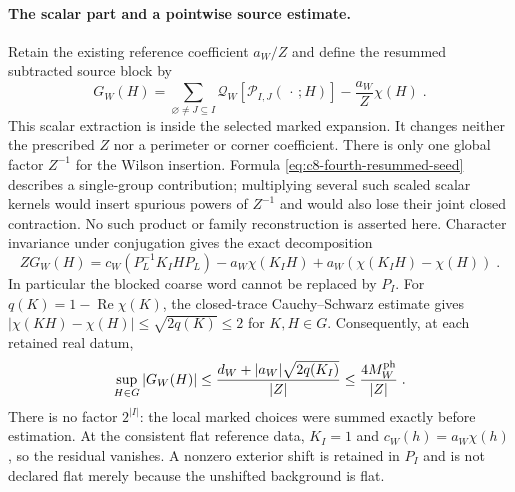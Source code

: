 \documentclass[11pt]{article}
\begin{document}
\paragraph{The scalar part and a pointwise source estimate.}
Retain the existing reference coefficient $a_W/Z$ and define
the resummed subtracted source block by
\begin{equation}\label{eq:c8-fourth-resummed-seed}
    G_W(H)=
        \sum_{\varnothing\neq J\subseteq I}
            \mathscr Q_W[\mathcal P_{I,J}(\,\cdot\,;H)]
        -\frac{a_W}{Z}\chi(H)\;.
\end{equation}
This scalar extraction is inside the selected marked expansion.
It changes neither the prescribed $Z$ nor a perimeter or corner
coefficient. There is only one global factor $Z^{-1}$ for the
Wilson insertion. Formula \eqref{eq:c8-fourth-resummed-seed}
describes a single-group contribution; multiplying several such
scaled scalar kernels would insert spurious powers of $Z^{-1}$
and would also lose their joint closed contraction. No such
product or family reconstruction is asserted here.
Character invariance under conjugation gives the
exact decomposition
\begin{equation}\label{eq:c8-fourth-seed-coarse-defect}
    ZG_W(H)=
        c_W(P_L^{-1}K_IHP_L)-a_W\chi(K_IH)
        +a_W(\chi(K_IH)-\chi(H))\;.
\end{equation}
In particular the blocked coarse word cannot be replaced by $P_I$.
For $q(K)=1-\operatorname{Re}\chi(K)$, the closed-trace
Cauchy--Schwarz estimate gives
$|\chi(KH)-\chi(H)|\leq\sqrt{2q(K)}\leq2$ for $K,H\in G$.
Consequently, at each retained real datum,
\begin{equation}\label{eq:c8-fourth-seed-pointwise}
    \sup_{H\in G}|G_W(H)|
        \leq\frac{d_W+|a_W|\sqrt{2q(K_I)}}{|Z|}
        \leq\frac{4M_W^{\rm ph}}{|Z|}\;.
\end{equation}
There is no factor $2^{|I|}$: the local marked choices were
summed exactly before estimation. At the consistent flat reference
data, $K_I=1$ and $c_W(h)=a_W\chi(h)$, so the residual vanishes.
A nonzero exterior shift is retained in $P_I$ and is not declared
flat merely because the unshifted background is flat.
\end{document}

